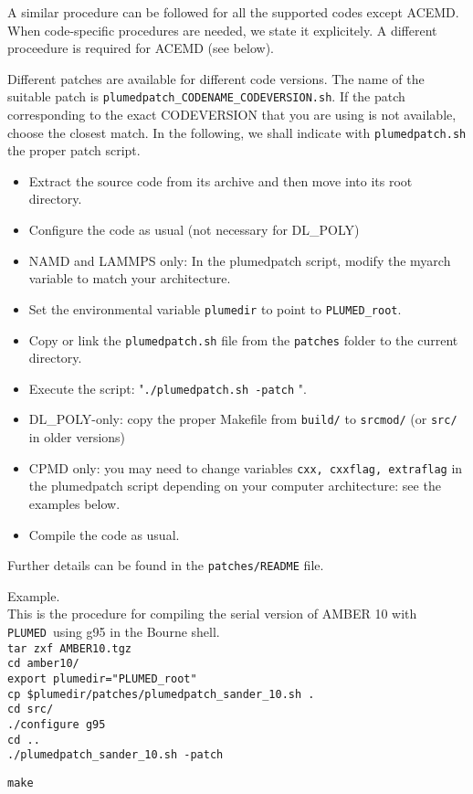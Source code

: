 \documentclass[12pt,fleqn]{report}
\newcommand{\plumed}{{\tt PLUMED}}
\newcommand{\esempio}[1]{
\vspace{10pt}
\begin{flushright}
\colorbox{light-gray}{
   \begin{minipage}{13cm}
       \scriptsize{
{\fontfamily{phv} \fontseries{b}
 \selectfont Example. \\
 \fontseries{m} \selectfont #1 } }
\end{minipage}}
\end{flushright}
\vspace{20pt}
}
\begin{document}
A similar procedure can be followed for all the supported codes except ACEMD.
When code-specific procedures are needed, we state it explicitely.
A different proceedure is required for ACEMD (see below).

Different patches are available for different code versions. The name
of the suitable patch is {\tt plumedpatch\_CODENAME\_CODEVERSION.sh}.
If the patch corresponding to the exact CODEVERSION that you are using is not
available, choose the closest match.
In the following, we shall indicate with {\tt plumedpatch.sh} the proper patch script.
\begin{itemize}
\item Extract the source code from its archive and then move into its root directory.
\item Configure the code as usual (not necessary for DL\_POLY)
\item NAMD and LAMMPS only: In the plumedpatch script, modify the myarch variable to match your architecture.
\item Set the environmental variable {\tt plumedir} to point to {\tt PLUMED\_root}.
\item Copy or link the {\tt plumedpatch.sh} file from the {\tt patches} folder to the current directory.
\item Execute the script: "{\tt ./plumedpatch.sh -patch} ".
\item DL\_POLY-only: copy the proper Makefile from {\tt build/} to {\tt srcmod/} (or {\tt src/} in older versions)
\item CPMD only: you may need to change variables {\tt cxx, cxxflag, extraflag} in the plumedpatch script
depending on your computer architecture: see the examples below.
\item Compile the code as usual.
\end{itemize}

Further details can be found in the {\tt patches/README} file.

\esempio{This is the procedure for compiling the serial version of AMBER 10 with \plumed \ using g95
in the Bourne shell. \vspace{10pt} \\
{\tt tar zxf AMBER10.tgz \\
cd amber10/ \\
export plumedir="PLUMED\_root" \\
cp \$plumedir/patches/plumedpatch\_sander\_10.sh . \\
cd src/ \\
./configure g95 \\
cd .. \\
./plumedpatch\_sander\_10.sh -patch \\
}

{\tt make}

}
\end{document}
